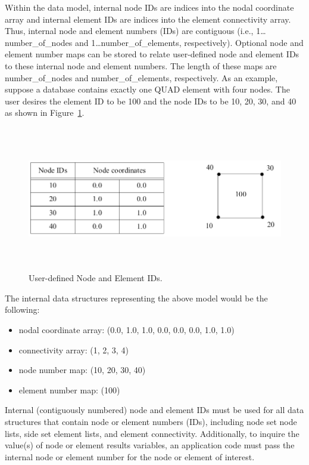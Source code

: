 Within the data model, internal node IDs are indices into 
the nodal coordinate array and internal element IDs are indices 
into the element connectivity array. Thus, internal node and 
element numbers (IDs) are contiguous (i.e., 1\ldots{number_of_nodes}
and 1\ldots{number_of_elements}, respectively). Optional 
node and element number maps can be stored to relate user-defined 
node and element IDs to these internal node and element numbers. 
The length of these maps are {number_of_nodes} and {number_of_elements}, 
respectively. As an example, suppose a database contains exactly 
one QUAD element with four nodes. The user desires the element 
ID to be 100 and the node IDs to be 10, 20, 30, and 40 as shown 
in  Figure~\ref{f:UserDefinedNodeElementIds}.
\begin{figure}[htbp]
\begin{center}
\includegraphics[width=5.972in, height=2.486in]{figures/UserDefinedNodeElementIds.png}
\caption{User-defined Node and Element IDs.}\label{f:UserDefinedNodeElementIds}
\end{center}
\end{figure}

The internal data structures representing the above model 
would be the following:


\begin{itemize}
 \item {nodal coordinate array}{:} {(0.0, 1.0, 1.0, 
0.0, 0.0, 0.0, 1.0, 1.0)}

 \item {connectivity array}{: (1, 2, 3, 4)}

 \item {node number map}{: (10, 20, 30, 40)}

 \item {element number map}{: (100)}
\end{itemize}


Internal (contiguously numbered) node and element IDs must be used for
all data structures that contain node or element numbers (IDs),
including node set node lists, side set element lists, and element
connectivity. Additionally, to inquire the value(s) of node or element
results variables, an application code must pass the internal node or
element number for the node or element of interest.




